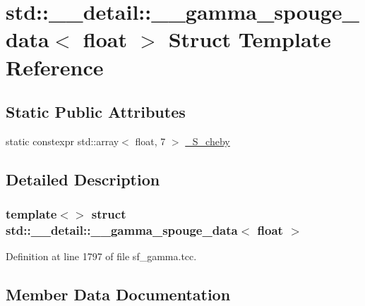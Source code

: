 \hypertarget{structstd_1_1____detail_1_1____gamma__spouge__data_3_01float_01_4}{}\section{std\+:\+:\+\_\+\+\_\+detail\+:\+:\+\_\+\+\_\+gamma\+\_\+spouge\+\_\+data$<$ float $>$ Struct Template Reference}
\label{structstd_1_1____detail_1_1____gamma__spouge__data_3_01float_01_4}
\subsection*{Static Public Attributes}
\begin{DoxyCompactItemize}
\item 
static constexpr std\+::array$<$ float, 7 $>$ \hyperlink{structstd_1_1____detail_1_1____gamma__spouge__data_3_01float_01_4_a7ea259a3aade6eb09d994482b687c515}{\+\_\+\+S\+\_\+cheby}
\end{DoxyCompactItemize}


\subsection{Detailed Description}
\subsubsection*{template$<$$>$\newline
struct std\+::\+\_\+\+\_\+detail\+::\+\_\+\+\_\+gamma\+\_\+spouge\+\_\+data$<$ float $>$}



Definition at line 1797 of file sf\+\_\+gamma.\+tcc.



\subsection{Member Data Documentation}
\mbox{\label{structstd_1_1____detail_1_1____gamma__spouge__data_3_01float_01_4_a7ea259a3aade6eb09d994482b687c515}} 
